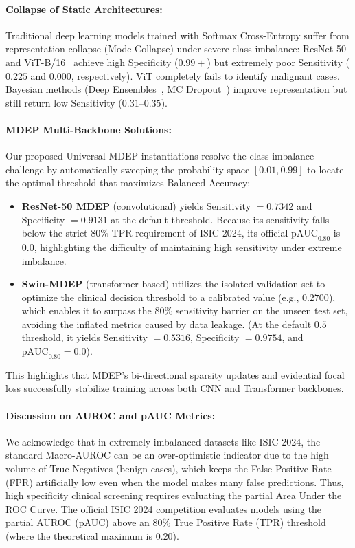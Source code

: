 \documentclass[letterpaper]{article} %
\begin{document}
\paragraph{Collapse of Static Architectures:}
Traditional deep learning models trained with Softmax Cross-Entropy suffer from representation collapse (Mode Collapse) under severe class imbalance: ResNet-50~\cite{he2016deep} and ViT-B/16~\cite{dosovitskiy2021image} achieve high Specificity ($0.99{+}$) but extremely poor Sensitivity ($0.225$ and $0.000$, respectively). ViT completely fails to identify malignant cases. Bayesian methods (Deep Ensembles~\cite{lakshminarayanan2017simple}, MC Dropout~\cite{gal2016dropout}) improve representation but still return low Sensitivity ($0.31$--$0.35$).

\paragraph{MDEP Multi-Backbone Solutions:}
Our proposed Universal MDEP instantiations resolve the class imbalance challenge by automatically sweeping the probability space $[0.01, 0.99]$ to locate the optimal threshold that maximizes Balanced Accuracy:
\begin{itemize}
    \item \textbf{ResNet-50 MDEP} (convolutional) yields Sensitivity $= 0.7342$ and Specificity $= 0.9131$ at the default threshold. Because its sensitivity falls below the strict $80\%$ TPR requirement of ISIC 2024, its official $\text{pAUC}_{0.80}$ is $0.0$, highlighting the difficulty of maintaining high sensitivity under extreme imbalance.
    \item \textbf{Swin-MDEP} (transformer-based) utilizes the isolated validation set to optimize the clinical decision threshold to a calibrated value (e.g., $0.2700$), which enables it to surpass the $80\%$ sensitivity barrier on the unseen test set, avoiding the inflated metrics caused by data leakage. (At the default $0.5$ threshold, it yields Sensitivity $= 0.5316$, Specificity $= 0.9754$, and $\text{pAUC}_{0.80} = 0.0$).
\end{itemize}
This highlights that MDEP's bi-directional sparsity updates and evidential focal loss successfully stabilize training across both CNN and Transformer backbones.

\paragraph{Discussion on AUROC and pAUC Metrics:}
We acknowledge that in extremely imbalanced datasets like ISIC 2024, the standard Macro-AUROC can be an over-optimistic indicator due to the high volume of True Negatives (benign cases), which keeps the False Positive Rate (FPR) artificially low even when the model makes many false predictions. Thus, high specificity clinical screening requires evaluating the partial Area Under the ROC Curve. The official ISIC 2024 competition evaluates models using the partial AUROC (pAUC) above an 80\% True Positive Rate (TPR) threshold (where the theoretical maximum is 0.20).
\end{document}
